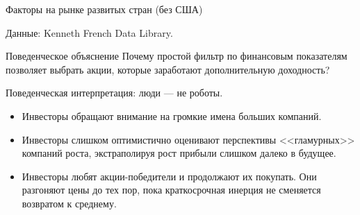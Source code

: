 \documentclass{beamer}
\begin{document}
\begin{frame}{Факторы на рынке развитых стран (без США)}
\centering
{\scriptsize Данные: Kenneth French Data Library.}
\end{frame}



\begin{frame}{Поведенческое объяснение}
\justify
Почему простой фильтр по финансовым показателям позволяет выбрать акции, 
которые заработают дополнительную доходность?

\justify
Поведенческая интерпретация: люди --- не роботы.
\begin{itemize}
\justifying
\item Инвесторы обращают внимание на громкие имена больших компаний.
\item Инвесторы слишком оптимистично оценивают перспективы <<гламурных>>
компаний роста, экстраполируя рост прибыли слишком далеко в будущее.
\item Инвесторы любят акции-победители и продолжают их покупать. Они разгоняют
цены до тех пор, пока краткосрочная инерция не сменяется возвратом к среднему.
\end{itemize}

\end{frame}
\end{document}
